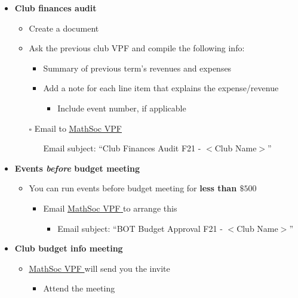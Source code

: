 \documentclass[utf8]{article}
\makeatletter
\newcommand{\termandyear}{F21 }
\newcommand{\MathSocVPF}{\href{mailto:vpf@mathsoc.uwaterloo.ca}{\underline{MathSoc VPF} }}
\makeatother
\begin{document}
\begin{itemize}
\begin{itemize}
    \end{itemize}
    \item \textbf{Club finances audit}
    \begin{itemize}
        \item Create a document
        \item Ask the previous club VPF and compile the following info:
        \begin{itemize}
            \item Summary of previous term’s revenues and expenses
            \item Add a note for each line item that explains the expense/revenue
            \begin{itemize}
                \item Include event number, if applicable
            \end{itemize}
        \end{itemize}
        \item[$\square$] Email to \MathSocVPF 
            \begin{itemize}
                \item[\textperiodcentered] Email subject: ``Club Finances Audit \termandyear - $<$Club Name$>$''
            \end{itemize}
    \end{itemize}
    \item \textbf{Events \textit{before} budget meeting}
    \begin{itemize}
        \item You can run events before budget meeting for \textbf{less than $\$500$}
        \begin{itemize}
            \item Email \MathSocVPF to arrange this
            \begin{itemize}
                \item Email subject: ``BOT Budget Approval \termandyear - $<$Club Name$>$''
            \end{itemize}
        \end{itemize}
    \end{itemize}
    \item \textbf{Club budget info meeting}
    \begin{itemize}
        \item \MathSocVPF will send you the invite
        \begin{itemize}
            \item Attend the meeting 

\end{itemize}
\end{itemize}
\end{itemize}
\end{document}
